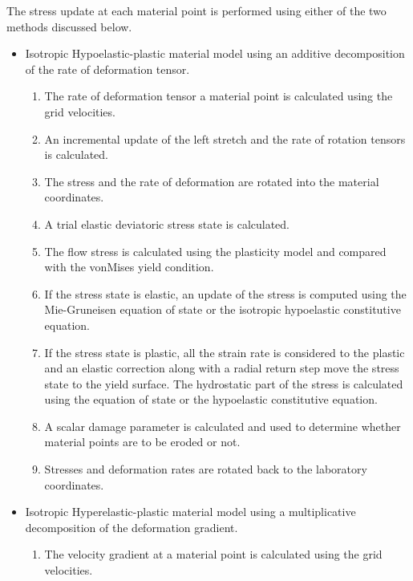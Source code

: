 The stress update at each material point is performed using either
of the two methods discussed below.
\begin{itemize}
   \item Isotropic Hypoelastic-plastic material model using an 
         additive decomposition of the rate of deformation tensor.
     \begin{enumerate}
        \item The rate of deformation tensor a material point
              is calculated using the grid velocities.
        \item An incremental update of the left stretch and the
              rate of rotation tensors is calculated.
        \item The stress and the rate of deformation are rotated
              into the material coordinates.
        \item A trial elastic deviatoric stress state is calculated.
        \item The flow stress is calculated using the plasticity
              model and compared with the vonMises yield condition.
        \item If the stress state is elastic, an update of the 
              stress is computed using the Mie-Gruneisen equation
              of state or the isotropic hypoelastic constitutive
              equation.
        \item If the stress state is plastic, all the strain rate 
              is considered to the plastic and an elastic correction
              along with a radial return step move the stress state
              to the yield surface.  The hydrostatic part of the 
              stress is calculated using the equation of state or
              the hypoelastic constitutive equation.
        \item A scalar damage parameter is calculated and used
              to determine whether material points are to be eroded
              or not.
        \item Stresses and deformation rates are rotated back to the
              laboratory coordinates.
     \end{enumerate}
   \item Isotropic Hyperelastic-plastic material model using a 
         multiplicative decomposition of the deformation gradient.
     \begin{enumerate}
        \item The velocity gradient at a material point
              is calculated using the grid velocities.

\end{enumerate}
\end{itemize}
